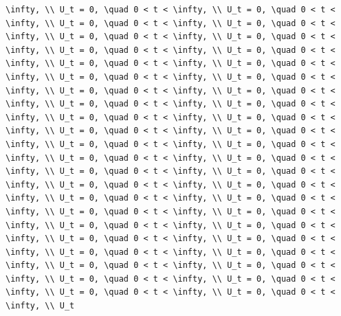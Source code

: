 \documentclass[
  ukrainian,
]{article}
\begin{document}
\begin{verbatim}
\infty, \\ U_t = 0, \quad 0 < t < \infty, \\ U_t = 0, \quad 0 < t < \infty, \\ U_t = 0, \quad 0 < t < \infty, \\ U_t = 0, \quad 0 < t < \infty, \\ U_t = 0, \quad 0 < t < \infty, \\ U_t = 0, \quad 0 < t < \infty, \\ U_t = 0, \quad 0 < t < \infty, \\ U_t = 0, \quad 0 < t < \infty, \\ U_t = 0, \quad 0 < t < \infty, \\ U_t = 0, \quad 0 < t < \infty, \\ U_t = 0, \quad 0 < t < \infty, \\ U_t = 0, \quad 0 < t < \infty, \\ U_t = 0, \quad 0 < t < \infty, \\ U_t = 0, \quad 0 < t < \infty, \\ U_t = 0, \quad 0 < t < \infty, \\ U_t = 0, \quad 0 < t < \infty, \\ U_t = 0, \quad 0 < t < \infty, \\ U_t = 0, \quad 0 < t < \infty, \\ U_t = 0, \quad 0 < t < \infty, \\ U_t = 0, \quad 0 < t < \infty, \\ U_t = 0, \quad 0 < t < \infty, \\ U_t = 0, \quad 0 < t < \infty, \\ U_t = 0, \quad 0 < t < \infty, \\ U_t = 0, \quad 0 < t < \infty, \\ U_t = 0, \quad 0 < t < \infty, \\ U_t = 0, \quad 0 < t < \infty, \\ U_t = 0, \quad 0 < t < \infty, \\ U_t = 0, \quad 0 < t < \infty, \\ U_t = 0, \quad 0 < t < \infty, \\ U_t = 0, \quad 0 < t < \infty, \\ U_t = 0, \quad 0 < t < \infty, \\ U_t = 0, \quad 0 < t < \infty, \\ U_t = 0, \quad 0 < t < \infty, \\ U_t = 0, \quad 0 < t < \infty, \\ U_t = 0, \quad 0 < t < \infty, \\ U_t = 0, \quad 0 < t < \infty, \\ U_t = 0, \quad 0 < t < \infty, \\ U_t = 0, \quad 0 < t < \infty, \\ U_t = 0, \quad 0 < t < \infty, \\ U_t = 0, \quad 0 < t < \infty, \\ U_t = 0, \quad 0 < t < \infty, \\ U_t = 0, \quad 0 < t < \infty, \\ U_t = 0, \quad 0 < t < \infty, \\ U_t = 0, \quad 0 < t < \infty, \\ U_t

\end{verbatim}
\end{document}
